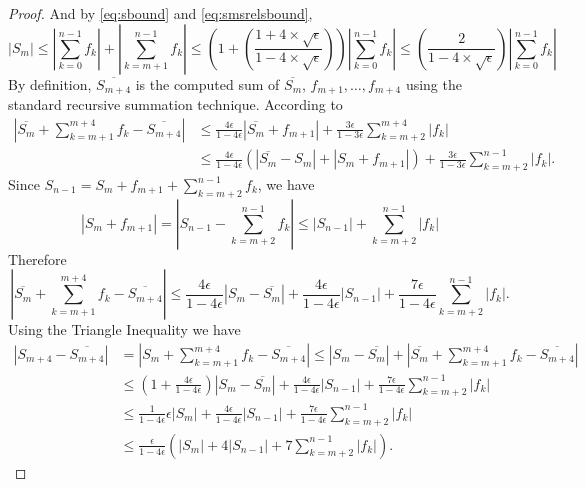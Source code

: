 \documentclass[12pt]{article}
\theoremstyle{definition}
\numberwithin{equation}{section}
\numberwithin{figure}{section}
\begin{document}
\begin{proof}
      And by \eqref{eq:sbound} and \eqref{eq:smsrelsbound},
      \begin{equation}
        |S_m| \leq |\sum\limits_{k = 0}^{n - 1}f_k| + |\sum\limits_{k = m + 1}^{n - 1} f_k| \leq (1 + (\frac{1 + 4 \times \sqrt\epsilon}{1 - 4 \times \sqrt\epsilon}))|\sum\limits_{k = 0}^{n - 1}f_k| \leq (\frac{2}{1 - 4 \times \sqrt\epsilon})|\sum\limits_{k = 0}^{n - 1}f_k|
        \label{eq:smrelsbound}
      \end{equation}
    By definition, $\overline{S_{m+4}}$ is the computed sum of
    $\overline{S_m}$, $f_{m+1}, \ldots, f_{m+4}$ using the standard recursive summation technique.
    According to \cite[Equation 1.2, 2.4]{higham}
    \begin{align*}
        |\overline{S_m} + \sum_{k=m+1}^{m+4}f_k - \overline{S_{m+4}}|
        & \leq \frac{4\epsilon}{1-4\epsilon} |\overline{S_m} + f_{m+1}| + \frac{3\epsilon}{1-3\epsilon} \sum_{k=m+2}^{m+4}|f_k| \\
        & \leq \frac{4\epsilon}{1-4\epsilon} (|\overline{S_m} - S_m| + |S_m + f_{m+1}|)
            + \frac{3\epsilon}{1-3\epsilon} \sum_{k=m+2}^{n-1}|f_k|.
    \end{align*}
    Since $S_{n-1} = S_m + f_{m+1} + \sum_{k=m+2}^{n-1} f_k$, we have
    \[
        |S_m + f_{m+1}|
        = |S_{n-1} - \sum_{k=m+2}^{n-1}f_k|
        \leq |S_{n-1}| + \sum_{k=m+2}^{n-1} |f_k| 
    \]
    Therefore
    \[
        |\overline{S_m} + \sum_{k=m+1}^{m+4}f_k - \overline{S_{m+4}}|
        \leq \frac{4\epsilon}{1-4\epsilon} |S_m - \overline{S_m}|
        + \frac{4\epsilon}{1-4\epsilon} |S_{n-1}|
        + \frac{7\epsilon}{1-4\epsilon} \sum_{k=m+2}^{n-1}|f_k|. 
    \]
    Using the Triangle Inequality we have
    \begin{align*}
    |S_{m+4} - \overline{S_{m+4}}| 
        & = |S_m + \sum_{k=m+1}^{m+4}f_k - \overline{S_{m+4}}| 
        \leq |S_m - \overline{S_m} | + |\overline{S_m} + \sum_{k=m+1}^{m+4}f_k - \overline{S_{m+4}} | \\
        & \leq (1 + \frac{4\epsilon}{1-4\epsilon}) |S_m - \overline{S_m}| + \frac{4\epsilon}{1-4\epsilon} |S_{n-1}|
                + \frac{7\epsilon}{1-4\epsilon} \sum_{k=m+2}^{n-1}|f_k| \\
        & \leq \frac{1}{1-4\epsilon} \epsilon |S_m| + \frac{4\epsilon}{1-4\epsilon} |S_{n-1}|
                + \frac{7\epsilon}{1-4\epsilon} \sum_{k=m+2}^{n-1}|f_k| \\
        & \leq \frac{\epsilon}{1-4\epsilon} \left(|S_m| + 4 |S_{n-1}|
                + 7 \sum_{k=m+2}^{n-1}|f_k|\right). 

\end{align*}
\end{proof}
\end{document}
